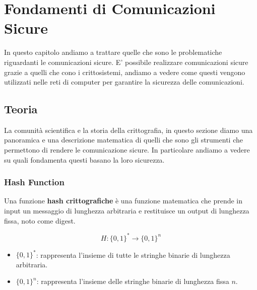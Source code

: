 \newcommand{\drawkey}[3]{
    \draw[line width=0.07cm, draw=#2] (#1) circle [radius=0.15cm];
    \draw[line width=0.07cm, draw=#2] (#1 -0.15) -- ++(0,-0.4);
    \draw[line width=0.07cm, draw=#2] (#1 -0.35) -- ++(-0.2,0);
    \draw[line width=0.07cm, draw=#2] (#1 -0.51) -- ++(-0.2,0);
    \node[below, text=#2] at (#1 -0.6) {#3}
}

\newcommand{\drawcurlybrace}[3]{%
    \draw [decorate,decoration={brace,amplitude=10pt,mirror},xshift=-4pt,yshift=0pt]
    (#1) -- (#2) node [black,midway,xshift=-2cm] {};
}

\chapter{Fondamenti di Comunicazioni Sicure}
\label{Capitolo 2} 

In questo capitolo andiamo a trattare quelle che sono le problematiche riguardanti le comunicazioni sicure.
E' possibile realizzare comunicazioni sicure grazie a quelli che cono i crittosistemi, andiamo a vedere come questi vengono utilizzati nelle reti 
di computer per garantire la sicurezza delle comunicazioni.

\section{Teoria}

La comunità scientifica e la storia della crittografia, in questo sezione diamo una panoramica e una descrizione matematica di quelli che sono gli strumenti 
che permettono di rendere le comunicazione sicure. In particolare andiamo a vedere su quali fondamenta questi basano la loro sicurezza.

\subsection{Hash Function}

Una funzione \textbf{hash crittografiche} è una funzione matematica che prende in input un messaggio di lunghezza arbitraria e restituisce un output di
lunghezza fissa, noto come digest.

\begin{equation}
    H: \{0,1\}^*  \to \{0,1\}^n
\end{equation}

\begin{itemize}
    \item $\{0,1\}^*$: rappresenta l'insieme di tutte le stringhe binarie di lunghezza arbitraria.
    \item $\{0,1\}^n$: rappresenta l'insieme delle stringhe binarie di lunghezza fissa $n$.
\end{itemize}

